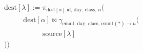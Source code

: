 \documentclass{article}
\newcommand{\source}[1]{\ensuremath{\text{source}\left[{#1}\right]}}
\newcommand{\dest}[1]{\ensuremath{\text{dest}\left[{#1}\right]}}
\newcommand{\ind}{\ensuremath{\phantom{= =}}}
\begin{document}
\begin{center}
\begin{preview}
	\hspace*{-2.95cm}\vbox{
		\begin{align*}
			&\dest{\lambda} := \pi_{\dest{\alpha}.\text{id} \text{, day, class, } n} \bigl(\\
			&\ind \dest{\alpha} \bowtie \gamma_{\text{email, day, class, count} (*) \rightarrow n} \bigl( \nonumber\\
			&\ind\ind \source{\lambda} \nonumber\\
			&\bigr)\bigr) \nonumber\\
		\end{align*}
	}\hspace*{-2.95cm}
\end{preview}
\end{center}
\end{document}
